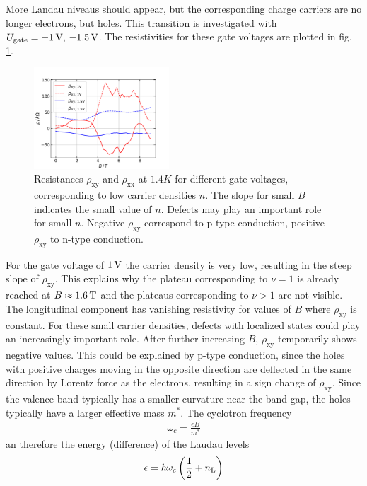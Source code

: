 More Landau niveaus should appear, but the corresponding charge carriers are no longer electrons, but holes.
This transition is investigated with $U_\text{gate}=-1 \,\text V,\,-1.5 \,\text V$.
The resistivities for these gate voltages are plotted in fig. \ref{fig:kaputteKurvenGateV}.
\begin{figure}[h]
    \centering
    \includegraphics[width=0.45\textwidth]{../Images/kaputteKurvenGateV.png}
    \caption{
        Resistances $\rho_\text{xy}$ and $\rho_\text{xx}$ at $1.4K$ for different gate voltages, corresponding to low carrier densities $n$.  
        The slope for small $B$ indicates the small value of $n$.
        Defects may play an important role for small $n$.
        Negative $\rho_\text{xy}$ correspond to p-type conduction, positive $\rho_\text{xy}$ to n-type conduction.}
    \label{fig:kaputteKurvenGateV}
\end{figure}
For the gate voltage of $1\,\text V$ the carrier density is very low, resulting in the steep slope of $\rho_\text{xy}$.
This explains why the plateau corresponding to $\nu = 1$ is already reached at $B\approx1.6 \,\text T$ and the plateaus corresponding to $\nu > 1$ are not visible.
The longitudinal component has vanishing resistivity for values of $B$ where $\rho_\text{xy}$ is constant.
For these small carrier densities, defects with localized states could play an increasingly important role.
After further increasing $B$, $\rho_\text{xy}$ temporarily shows negative values.
This could be explained by p-type conduction, 
since the holes with positive charges moving in the opposite direction are deflected in the same direction by Lorentz force as the electrons, resulting in a sign change of $\rho_\text{xy}$.
Since the valence band typically has a smaller curvature near the band gap, the holes typically have a larger effective mass $m^\ast$.
The cyclotron frequency
\begin{align}
    \omega_c = \frac{eB}{m^\ast}    
\end{align}
an therefore the energy (difference) of the Laudau levels
\begin{align}
    \epsilon = \hbar \omega_c \left(\frac{1}{2} + n_\text L \right)
\end{align}
